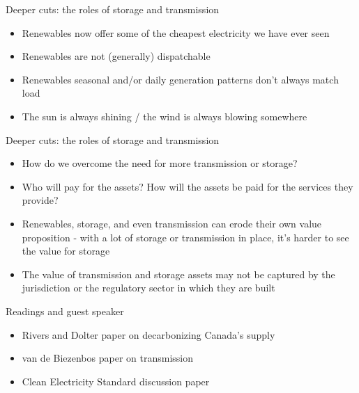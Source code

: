 \documentclass[aspectratio=169]{beamer}
\renewcommand{\(}{\begin{columns}}
\renewcommand{\)}{\end{columns}}
\newcommand{\<}[1]{\begin{column}{#1}}
\renewcommand{\>}{\end{column}}
\begin{document}
\begin{frame}{Deeper cuts: the roles of storage and transmission}
\begin{itemize}
\setlength\itemsep{2em}
\item Renewables now offer some of the cheapest electricity we have ever seen
\item Renewables are not (generally) dispatchable
\item Renewables seasonal and/or daily generation patterns don't always match load
\item The sun is always shining / the wind is always blowing somewhere
\end{itemize}

\vfill \end{frame}



\begin{frame}{Deeper cuts: the roles of storage and transmission}
\begin{itemize}
\setlength\itemsep{2em}
\item How do we overcome the need for more transmission or storage?
\item Who will pay for the assets? How will the assets be paid for the services they provide?
\item Renewables, storage, and even transmission can erode their own value proposition - with a lot of storage or transmission in place, it's harder to see the value for storage
\item The value of transmission and storage assets may not be captured by the jurisdiction or the regulatory sector in which they are built

\end{itemize}

\vfill \end{frame}



\begin{frame}{Readings and guest speaker}
\begin{itemize}
\setlength\itemsep{2em}
\item Rivers and Dolter paper on decarbonizing Canada's supply
\item van de Biezenbos paper on transmission

\item Clean Electricity Standard discussion paper

\end{itemize}

\vfill \end{frame}
\end{document}
